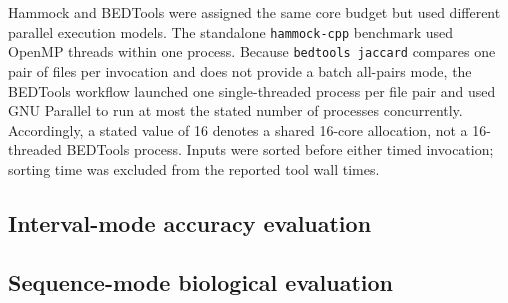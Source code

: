 \documentclass[11pt]{article}
\newcommand{\program}[1]{\texttt{#1}}
\begin{document}
Hammock and BEDTools were assigned the same core budget but used different parallel execution models. The standalone \program{hammock-cpp} benchmark used OpenMP threads within one process. Because \texttt{bedtools jaccard} compares one pair of files per invocation and does not provide a batch all-pairs mode, the BEDTools workflow launched one single-threaded process per file pair and used GNU Parallel to run at most the stated number of processes concurrently. Accordingly, a stated value of 16 denotes a shared 16-core allocation, not a 16-threaded BEDTools process. Inputs were sorted before either timed invocation; sorting time was excluded from the reported tool wall times.

\subsection{Interval-mode accuracy evaluation}

\subsection{Sequence-mode biological evaluation}



\end{document}
